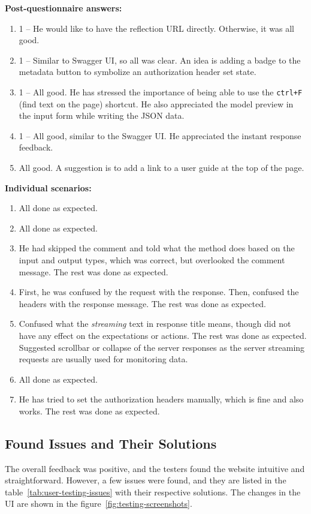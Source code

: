 \textbf{Post-questionnaire answers:}
\begin{enumerate}
    \item 1 -- He would like to have the reflection URL directly.
    Otherwise, it was all good.
    \item 1 -- Similar to Swagger UI, so all was clear.
    An idea is adding a badge to the metadata button to symbolize an authorization header set state.
    \item 1 -- All good.
    He has stressed the importance of being able to use the \verb|ctrl+F| (find text on the page) shortcut.
    He also appreciated the model preview in the input form while writing the JSON data.
    \item 1 -- All good, similar to the Swagger UI\@.
    He appreciated the instant response feedback.
    \item All good.
    A suggestion is to add a link to a user guide at the top of the page.
\end{enumerate}

\textbf{Individual scenarios:}
\begin{enumerate}
    \item All done as expected.
    \item All done as expected.
    \item He had skipped the comment and told what the method does based on the input and output types, which was correct, but overlooked the comment message.
    The rest was done as expected.
    \item First, he was confused by the request with the response.
    Then, confused the headers with the response message.
    The rest was done as expected.
    \item Confused what the \textit{streaming} text in response title means, though did not have any effect on the expectations or actions.
    The rest was done as expected.
    Suggested scrollbar or collapse of the server responses as the server streaming requests are usually used for monitoring data.
    \item All done as expected.
    \item He has tried to set the authorization headers manually, which is fine and also works.
    The rest was done as expected.
\end{enumerate}

\subsection{Found Issues and Their Solutions}\label{subsec:found-issues-and-their-solutions}
The overall feedback was positive, and the testers found the website intuitive and straightforward.
However, a few issues were found, and they are listed in the table~\ref{tab:user-testing-issues} with their respective solutions.
The changes in the UI are shown in the figure~\ref{fig:testing-screenshots}.

